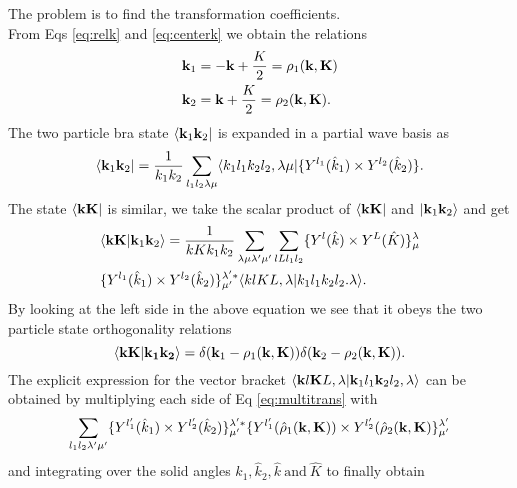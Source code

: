 The problem is to find the transformation
coefficients.\\
From Eqs \eqref{eq:relk} and \eqref{eq:centerk} we obtain the relations
\begin{equation*}
		\begin{split}
				&\bold k_1=-\bold k +\frac{K}{2}=\bold \rho_1(\bold k,\bold K)\\
				& \bold k_2=\bold k + \frac{K}{2}=\bold \rho_2(\bold k,\bold K).
		\end{split}
\end{equation*}
The two particle bra state $\langle \bold k_1 \bold k_2|$ is expanded in a partial wave basis as
\begin{equation*}
		\langle \bold k_1 \bold k_2|=\frac{1}{k_1k_2}\sum_{l_1l_2\lambda \mu}\langle k_1l_1k_2l_2,\lambda \mu|\{Y^{l_1}(\hat k_1)\times Y^{l_2}(\hat k_2) \}.
\end{equation*}
The state $\langle \bold k \bold K|$ is similar, we take the scalar product of $\langle \bold k \bold K|$ and $|\bold k_1 \bold k_2\rangle$ and get
\begin{equation}
		\begin{split}
				&\braket{\bold k \bold K}{\bold k_1 \bold k_2}=\frac{1}{kKk_1k_2}\sum_{\lambda \mu \lambda' \mu'}\sum_{lLl_1l_2}\{Y^l(\hat k)\times Y^L(\hat K)\}^\lambda_\mu\\
				&\{Y^{l_1}(\hat k_1)\times Y^{l_2}(\hat k_2) \}^{\lambda'*}_{\mu'}\braket{klKL,\lambda}{k_1l_1k_2l_2.\lambda}.
		\end{split}
		\label{eq:multitrans}
\end{equation}
By looking at the left side in the above equation we see that it obeys the two particle state orthogonality relations 
\begin{equation*}
		\langle \bold k \bold K|\bold{k_1 k_2}\rangle=\delta(\bold k_1-\rho_1(\bold k,\bold K))\delta(\bold k_2-\rho_2(\bold k,\bold K)).
\end{equation*}
The explicit expression for the vector bracket $\langle \bold k l \bold K L,\lambda|\bold k_1 l_1 \bold k_2 l_2, \lambda\rangle$ can be obtained by multiplying each side of Eq \eqref{eq:multitrans} with
\begin{equation*}
		\sum_{l_1l_2\lambda'\mu'}\{Y^{l_1'}(\hat k_1)\times Y^{l_2'}(\hat k_2) \}^{\lambda'*}_{\mu'}\{Y^{l_1'}(\hat\rho_1(\bold k,\bold K))\times Y^{l_2'}(\hat \rho_2(\bold k,\bold K) \}^{\lambda'}_{\mu'}
\end{equation*}
and integrating over the solid angles $\hat k_1, \hat k_2,\hat k~ \mbox{and} ~\hat K$ to finally obtain
